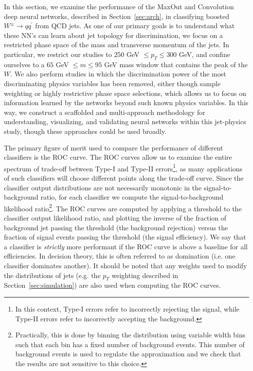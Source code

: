 
In this section, we examine the performance of the MaxOut and Convolution deep neural networks, described in Section~\ref{sec:arch}, in classifying boosted $W^\pm \to q q^\prime$ from QCD jets.  As one of our primary goals is to understand  what these NN's can learn about jet topology for discrimination, we focus on a restricted phase space of the mass and transverse momentum of the jets.  In particular, we restrict our studies to $250$ GeV $\leq p_T \leq 300$ GeV, and confine ourselves to a $65$ GeV $\leq m \leq 95$ GeV mass window that contains the peak of the $W$.   We also perform studies in which the discrimination power of the most discriminating physics variables has been removed, either though sample weighting or highly restrictive phase space selections, which allows us to focus on information learned by the networks beyond such known physics variables.  In this way, we construct a scaffolded and multi-approach methodology for understanding, visualizing, and validating neural networks within this jet-physics study, though these approaches could be used broadly.

The primary figure of merit used to compare the performance of different classifiers is the ROC curve.  The ROC curves allow us to examine the entire spectrum of trade-off between Type-I and Type-II errors\footnote{In this context, Type-I errors refer to incorrectly rejecting the signal, while Type-II errors refer to incorrectly accepting the background.}, as many applications of such classifiers will choose different points along the trade-off curve.   Since the classifier output distributions are not necessarily monotonic in the signal-to-background ratio, for each classifier we compute the  signal-to-background likelihood ratio\footnote{Practically, this is done by binning the distribution using variable width bins such that each bin has a fixed number of background events.  This number of background events is used to regulate the approximation and we check that the results are not sensitive to this choice.}.  The ROC curves are computed by applying a threshold to the classifier output likelihood ratio, and plotting the inverse of the fraction of background jet passing the threshold (the background rejection) versus the fraction of signal events passing the threshold (the signal efficiency).  We say that a classifier is \emph{strictly} more performant if the ROC curve is above a baseline for all efficiencies.  In decision theory, this is often referred to as domination (i.e. one classifier dominates another). It should be noted that any weights used to modify the distributions of jets (e.g. the $p_{T}$ weighting described in Section~\ref{sec:simulation}) are also used when computing the ROC curves.

